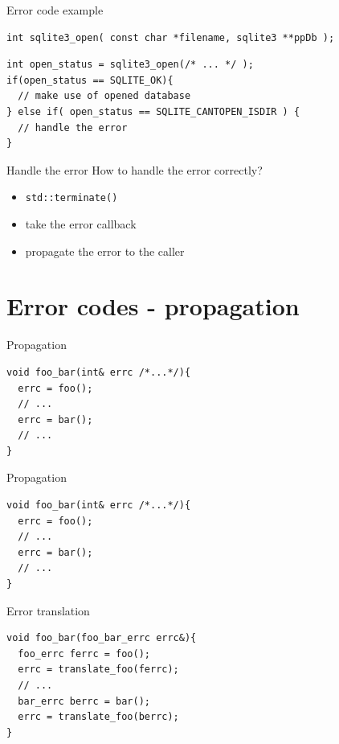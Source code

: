 \documentclass[10pt]{beamer}
\begin{document}
\begin{frame}[fragile]{Error code example}
\begin{verbatim}
int sqlite3_open( const char *filename, sqlite3 **ppDb );
\end{verbatim}

\hrulefill

\begin{verbatim}
int open_status = sqlite3_open(/* ... */ );
if(open_status == SQLITE_OK){
  // make use of opened database
} else if( open_status == SQLITE_CANTOPEN_ISDIR ) {
  // handle the error
}
\end{verbatim}

\end{frame}


\begin{frame}{Handle the error}
	How to handle the error correctly?
	
	\pause
	
	\begin{itemize}[<+- | alert@+>]
		\item \texttt{std::terminate()}
		\item take the error callback
		\item propagate the error to the caller
	\end{itemize}
	
\end{frame}

\section{Error codes - propagation}

\begin{frame}[fragile]{Propagation}
	\begin{verbatim}
void foo_bar(int& errc /*...*/){
  errc = foo();
  // ...
  errc = bar();		
  // ...
}
	\end{verbatim}
	
\end{frame}

\begin{frame}[fragile]{Propagation}
\begin{verbatim}
void foo_bar(int& errc /*...*/){
  errc = foo();
  // ...
  errc = bar();		
  // ...
}
\end{verbatim}

\end{frame}

\begin{frame}[fragile]{Error translation}
	\begin{verbatim}
void foo_bar(foo_bar_errc errc&){
  foo_errc ferrc = foo();
  errc = translate_foo(ferrc);
  // ...
  bar_errc berrc = bar();
  errc = translate_foo(berrc);
}
	\end{verbatim}
\end{frame}
\end{document}
